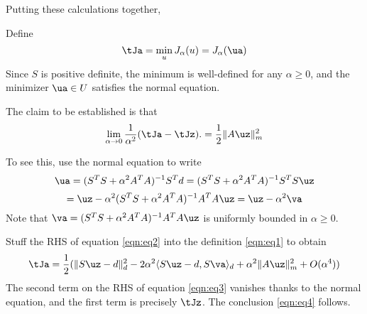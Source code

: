 Putting these calculations together,





Define
\begin{equation}
  \label{eqn:eq0}
  \tJa = \min_u J_{\alpha}(u) = J_{\alpha}(\ua)
\end{equation}
Since $S$ is positive definite, the minimum is well-defined for any $\alpha \ge 0$, and the minimizer $\ua \in U$ satisfies the normal equation.

The claim to be established is that
\begin{equation}
  \label{eqn:eq4}
  \lim_{\alpha \rightarrow 0} \frac{1}{\alpha^2}  (\tJa-\tJz).= \frac{1}{2}\|A\uz\|_m^2
\end{equation}

To see this, use the normal equation to write
\[
  \ua = (S^TS + \alpha^2 A^TA)^{-1}S^Td = (S^TS + \alpha^2 A^TA)^{-1}S^TS \uz
\]
\begin{equation}
  \label{eqn:eq2}
  = \uz - \alpha^2 (S^TS + \alpha^2 A^TA)^{-1}A^TA\uz = \uz-\alpha^2 \va
\end{equation}
Note that $\va = (S^TS + \alpha^2 A^TA)^{-1}A^TA\uz$ is uniformly bounded in $\alpha \ge 0$.

Stuff the RHS of equation \ref{eqn:eq2} into the definition \ref{eqn:eq1} to obtain
\begin{equation}
  \label{eqn:eq3}
  \tJa = \frac{1}{2}(\|S\uz-d\|_d^2 - 2 \alpha^2\langle S\uz-d, S\va\rangle_d + \alpha^2\|A\uz\|_m^2 + O(\alpha^4))
\end{equation}
The second term on the RHS of equation \ref{eqn:eq3} vanishes thanks to the normal equation, and the first term is precisely $\tJz$. The conclusion \ref{eqn:eq4} follows.




